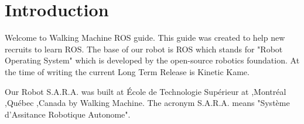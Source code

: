 \chapter{Introduction}
Welcome to Walking Machine ROS guide. This guide was created to help new recruits to learn ROS. The base of our robot is ROS which stands for "Robot Operating System" which is developed by the open-source robotics foundation. At the time of writing the current Long Term Release is Kinetic Kame. 

Our Robot S.A.R.A. was built at École de Technologie Supérieur at ,Montréal ,Québec ,Canada by Walking Machine. The acronym S.A.R.A. means "Système d'Assitance Robotique Autonome".